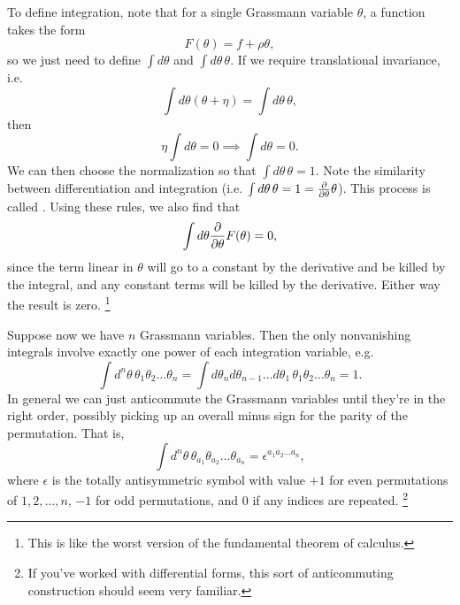 To define integration, note that for a single Grassmann variable $\theta$, a function takes the form
\begin{equation}
    F(\theta)=f+\rho \theta,
\end{equation}
so we just need to define $\int d\theta$ and $\int d\theta \,\theta$. If we require translational invariance, i.e.
\begin{equation}
    \int d\theta(\theta+\eta)=\int d\theta \,\theta,
\end{equation}
then
\begin{equation}
    \eta \int d\theta = 0 \implies \int d\theta =0.
\end{equation}
We can then choose the normalization so that $\int d\theta \, \theta = 1$. Note the similarity between differentiation and integration (i.e.  $\int d\theta\,\theta =1=\P{}{\theta}\theta$). This process is called . Using these rules, we also find that
\begin{equation}
    \int d\theta \P{}{\theta} F(\theta)=0,
\end{equation}
since the term linear in $\theta$ will go to a constant by the derivative and be killed by the integral, and any constant terms will be killed by the derivative. Either way the result is zero.%
    \footnote{This is like the worst version of the fundamental theorem of calculus.}

Suppose now we have $n$ Grassmann variables. Then the only nonvanishing integrals involve exactly one power of each integration variable, e.g.
\begin{equation}
    \int d^n \theta\, \theta_1 \theta_2 \ldots \theta_n = \int d\theta_n d\theta_{n-1}\ldots d\theta_1 \, \theta_1 \theta_2 \ldots \theta_n = 1.
\end{equation}
In general we can just anticommute the Grassmann variables until they're in the right order, possibly picking up an overall minus sign for the parity of the permutation. That is,
\begin{equation}
    \int d^n\theta \,\theta_{a_1}\theta_{a_2}\ldots \theta_{a_n} = \epsilon^{a_1 a_2 \ldots a_n},
\end{equation}
where $\epsilon$ is the totally antisymmetric symbol with value $+1$ for even permutations of $1,2,\ldots,n$, $-1$ for odd permutations, and $0$ if any indices are repeated.%
    \footnote{If you've worked with differential forms, this sort of anticommuting construction should seem very familiar.}

